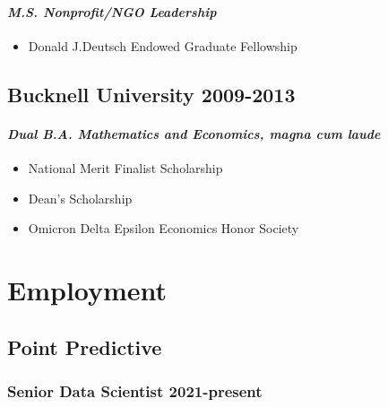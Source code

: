 \documentclass[11pt,a4paper,]{awesome-cv}
\providecommand{\tightlist}{%
	\setlength{\itemsep}{0pt}\setlength{\parskip}{0pt}}
\begin{document}
\hypertarget{m.s.-nonprofitngo-leadership}{%
\paragraph{\texorpdfstring{\emph{M.S. Nonprofit/NGO
Leadership}}{M.S. Nonprofit/NGO Leadership}}\label{m.s.-nonprofitngo-leadership}}

\begin{itemize}
\tightlist
\item
  Donald J.Deutsch Endowed Graduate Fellowship
\end{itemize}

\hypertarget{bucknell-university--2013}{%
\subsection{\texorpdfstring{\textbf{Bucknell University}
\hfill 2009-2013}{Bucknell University -2013}}\label{bucknell-university--2013}}

\hypertarget{dual-b.a.-mathematics-and-economics-magna-cum-laude}{%
\paragraph{\texorpdfstring{\emph{Dual B.A. Mathematics and Economics,
magna cum
laude}}{Dual B.A. Mathematics and Economics, magna cum laude}}\label{dual-b.a.-mathematics-and-economics-magna-cum-laude}}

\begin{itemize}
\tightlist
\item
  National Merit Finalist Scholarship
\item
  Dean's Scholarship
\item
  Omicron Delta Epsilon Economics Honor Society
\end{itemize}

\hypertarget{employment}{%
\section{Employment}\label{employment}}

\hypertarget{point-predictive}{%
\subsection{Point Predictive}\label{point-predictive}}

\hypertarget{senior-data-scientist--present}{%
\subsubsection{\texorpdfstring{Senior Data Scientist
\hfill 2021-present}{Senior Data Scientist -present}}\label{senior-data-scientist--present}}
\end{document}
